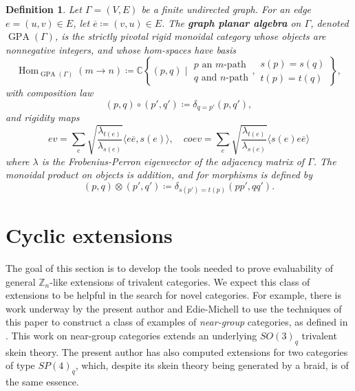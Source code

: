 \documentclass[pdflatex,sn-mathphys-num]{sn-jnl}%
\theoremstyle{thmstyleone}%
\theoremstyle{thmstyletwo}%
\theoremstyle{thmstylethree}%
\newtheorem{definition}{Definition}%
\newcommand{\Z}{\mathbb{Z}}
\newcommand{\C}{\mathbb{C}}
\newcommand{\ol}{\overline}
\DeclareMathOperator{\Hom}{Hom}
\DeclareMathOperator{\GPA}{GPA}
\begin{document}
\begin{definition}\label{def:GPA}
    Let $\Gamma=(V,E)$ be a finite undirected graph. 
    For an edge $e=(u,v)\in E$, let $\ol{e} \coloneq (v,u)\in E$. 
    The {\bf graph planar algebra} on $\Gamma$, denoted $\GPA(\Gamma)$, is the strictly pivotal rigid monoidal category 
    whose objects are nonnegative integers, and whose hom-spaces have basis
    \[
        \Hom_{\GPA(\Gamma)}(m\to n) \coloneqq \C\left\{ (p,q) \mid \substack{\text{$p$ an $m$-path} \\ \text{$q$ and $n$-path}}, \substack{\text{$s(p)=s(q)$}\\ \text{$t(p)=t(q)$}} \right\},
    \]
    with composition law
    \[
        (p,q)\circ(p',q')\coloneqq \delta_{q=p'} (p,q'),
    \]
    and rigidity maps
    \[
        ev = \sum_e \sqrt{ \frac{\lambda_{t(e)}}{\lambda_{s(e)}} } \langle e\ol{e},s(e) \rangle, 
        \quad coev = \sum_e \sqrt{ \frac{\lambda_{t(e)}}{\lambda_{s(e)}} } \langle s(e) e\ol{e} \rangle
    \]
    where $\lambda$ is the Frobenius-Perron eigenvector of the adjacency matrix of $\Gamma$.
    The monoidal product on objects is addition, and for morphisms is defined by 
    \[
        (p,q)\otimes(p',q')\coloneqq \delta_{s(p')=t(p)} (pp',qq').
    \]
\end{definition}
















\section{Cyclic extensions}\label{sec:skein}

The goal of this section is to develop the tools needed to prove evaluability of general $\Z_n$-like extensions of trivalent categories.
We expect this class of extensions to be helpful in the search for novel categories.
For example, there is work underway by the present author and Edie-Michell to use the techniques of this paper to 
construct a class of examples of {\it near-group} categories, as defined in \cite{gannon_near-groups}.
This work on near-group categories extends an underlying $SO(3)_q$ trivalent skein theory.
The present author has also computed extensions for two categories of type $SP(4)_q$, which, despite its skein theory being
generated by a braid, is of the same essence. 
\end{document}
